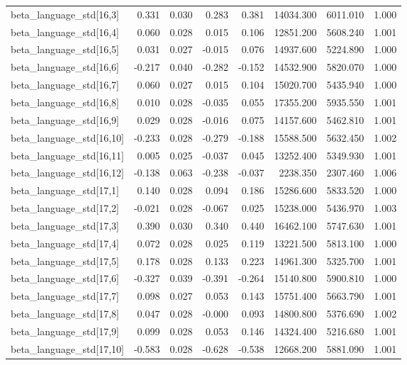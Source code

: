 \begin{tabular}{lrrrrrrr}
beta\_language\_std[16,3] & 0.331 & 0.030 & 0.283 & 0.381 & 14034.300 & 6011.010 & 1.000 \\
beta\_language\_std[16,4] & 0.060 & 0.028 & 0.015 & 0.106 & 12851.200 & 5608.240 & 1.001 \\
beta\_language\_std[16,5] & 0.031 & 0.027 & -0.015 & 0.076 & 14937.600 & 5224.890 & 1.000 \\
beta\_language\_std[16,6] & -0.217 & 0.040 & -0.282 & -0.152 & 14532.900 & 5820.070 & 1.000 \\
beta\_language\_std[16,7] & 0.060 & 0.027 & 0.015 & 0.104 & 15020.700 & 5435.940 & 1.000 \\
beta\_language\_std[16,8] & 0.010 & 0.028 & -0.035 & 0.055 & 17355.200 & 5935.550 & 1.001 \\
beta\_language\_std[16,9] & 0.029 & 0.028 & -0.016 & 0.075 & 14157.600 & 5462.810 & 1.001 \\
beta\_language\_std[16,10] & -0.233 & 0.028 & -0.279 & -0.188 & 15588.500 & 5632.450 & 1.002 \\
beta\_language\_std[16,11] & 0.005 & 0.025 & -0.037 & 0.045 & 13252.400 & 5349.930 & 1.001 \\
beta\_language\_std[16,12] & -0.138 & 0.063 & -0.238 & -0.037 & 2238.350 & 2307.460 & 1.006 \\
beta\_language\_std[17,1] & 0.140 & 0.028 & 0.094 & 0.186 & 15286.600 & 5833.520 & 1.000 \\
beta\_language\_std[17,2] & -0.021 & 0.028 & -0.067 & 0.025 & 15238.000 & 5436.970 & 1.003 \\
beta\_language\_std[17,3] & 0.390 & 0.030 & 0.340 & 0.440 & 16462.100 & 5747.630 & 1.001 \\
beta\_language\_std[17,4] & 0.072 & 0.028 & 0.025 & 0.119 & 13221.500 & 5813.100 & 1.000 \\
beta\_language\_std[17,5] & 0.178 & 0.028 & 0.133 & 0.223 & 14961.300 & 5325.700 & 1.001 \\
beta\_language\_std[17,6] & -0.327 & 0.039 & -0.391 & -0.264 & 15140.800 & 5900.810 & 1.000 \\
beta\_language\_std[17,7] & 0.098 & 0.027 & 0.053 & 0.143 & 15751.400 & 5663.790 & 1.001 \\
beta\_language\_std[17,8] & 0.047 & 0.028 & -0.000 & 0.093 & 14800.800 & 5376.690 & 1.002 \\
beta\_language\_std[17,9] & 0.099 & 0.028 & 0.053 & 0.146 & 14324.400 & 5216.680 & 1.001 \\
beta\_language\_std[17,10] & -0.583 & 0.028 & -0.628 & -0.538 & 12668.200 & 5881.090 & 1.001 \\

\end{tabular}
